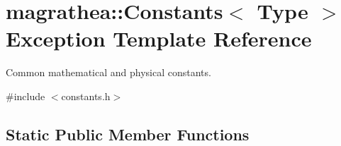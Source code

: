 \hypertarget{exceptionmagrathea_1_1Constants}{\section{magrathea\-:\-:Constants$<$ Type $>$ Exception Template Reference}
\label{exceptionmagrathea_1_1Constants}
}


Common mathematical and physical constants.  




{\ttfamily \#include $<$constants.\-h$>$}

\subsection*{Static Public Member Functions}
